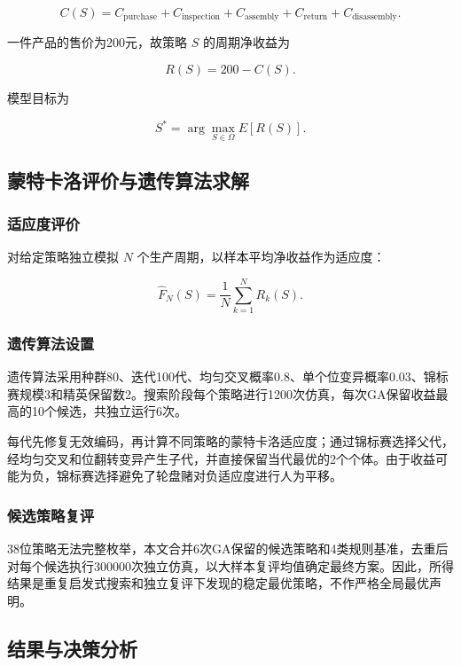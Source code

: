 \documentclass{cumcm}
\numberwithin{figure}{section}
\numberwithin{table}{section}
\begin{document}
\[
C(S)=C_{\mathrm{purchase}}+C_{\mathrm{inspection}}
+C_{\mathrm{assembly}}+C_{\mathrm{return}}
+C_{\mathrm{disassembly}}.
\]

一件产品的售价为200元，故策略 \(S\) 的周期净收益为

\[
R(S)=200-C(S).
\]

模型目标为

\[
S^*=\arg\max_{S\in\Omega}E[R(S)].
\]

\subsection{蒙特卡洛评价与遗传算法求解}\label{ux8499ux7279ux5361ux6d1bux8bc4ux4ef7ux4e0eux9057ux4f20ux7b97ux6cd5ux6c42ux89e3}

\subsubsection{适应度评价}\label{ux9002ux5e94ux5ea6ux8bc4ux4ef7}

对给定策略独立模拟 \(N\) 个生产周期，以样本平均净收益作为适应度：

\[
\widehat F_N(S)=\frac{1}{N}\sum_{k=1}^{N}R_k(S).
\]

\subsubsection{遗传算法设置}\label{ux9057ux4f20ux7b97ux6cd5ux8bbeux7f6e}

遗传算法采用种群80、迭代100代、均匀交叉概率0.8、单个位变异概率0.03、锦标赛规模3和精英保留数2。搜索阶段每个策略进行1200次仿真，每次GA保留收益最高的10个候选，共独立运行6次。

每代先修复无效编码，再计算不同策略的蒙特卡洛适应度；通过锦标赛选择父代，经均匀交叉和位翻转变异产生子代，并直接保留当代最优的2个个体。由于收益可能为负，锦标赛选择避免了轮盘赌对负适应度进行人为平移。

\subsubsection{候选策略复评}\label{ux5019ux9009ux7b56ux7565ux590dux8bc4}

38位策略无法完整枚举，本文合并6次GA保留的候选策略和4类规则基准，去重后对每个候选执行300000次独立仿真，以大样本复评均值确定最终方案。因此，所得结果是重复启发式搜索和独立复评下发现的稳定最优策略，不作严格全局最优声明。

\subsection{结果与决策分析}\label{ux7ed3ux679cux4e0eux51b3ux7b56ux5206ux6790}
\end{document}
